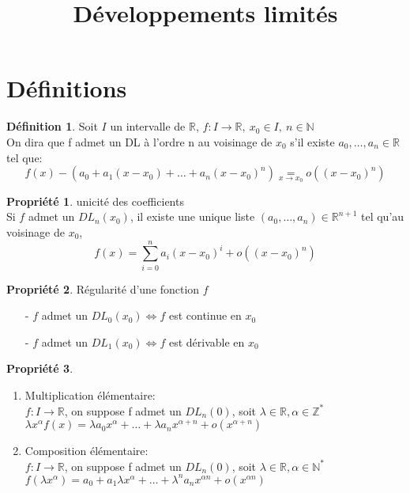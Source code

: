 \documentclass[fleqn]{article}
\title{D\'eveloppements limit\'es}
\date{}
\theoremstyle{definition} \newtheorem*{defi}{D\'efinition}
\theoremstyle{definition} \newtheorem*{theo}{Th\'eor\`eme}
\theoremstyle{definition} \newtheorem*{prop}{Propri\'et\'e}
\theoremstyle{definition} \newtheorem*{coro}{Corollaire}
\theoremstyle{remark} \newtheorem*{rqs}{Remarques}
\begin{document}
\maketitle

\section{D\'efinitions}
\begin{defi}
	Soit $I$ un intervalle de $\mathbb{R}$, $f:I \rightarrow \mathbb{R},\ x_0 \in I,\ n \in \mathbb{N}$ \\
	On dira que f admet un DL \`a l'ordre n au voisinage de $x_0$ s'il existe \mbox{$a_0, \hdots, a_n \in \mathbb{R}$} tel que: \\
	\[f(x) - (a_0 + a_1(x-x_0) + \hdots + a_n(x-x_0)^n) \underset{x \rightarrow x_0}{=} o((x-x_0)^n)\]
\end{defi}

\begin{prop} unicit\'e des coefficients \\
	Si $f$ admet un $DL_n(x_0)$, il existe une unique liste $(a_0, \hdots, a_n) \in \mathbb{R}^{n+1}$ tel qu'au voisinage de $x_0$,
	\[f(x) = \sum_{i=0}^{n} a_i(x-x_0)^i  + o((x-x_0)^n)\]
\end{prop}

\begin{prop} R\'egularit\'e d'une fonction $f$
	\begin{itemize}
		\item [-] $f$ admet un $DL_0(x_0) \Leftrightarrow f$ est continue en $x_0$
		\item [-] $f$ admet un $DL_1(x_0) \Leftrightarrow f$ est d\'erivable en $x_0$
	\end{itemize}
\end{prop}

\begin{prop}
	$\ $
	\begin{enumerate}
		\item Multiplication \'el\'ementaire: \\
		$f: I \rightarrow \mathbb{R}$, on suppose f admet un $DL_n(0)$, soit $\lambda \in \mathbb{R}, \alpha \in \mathbb{Z}^{*}$ \\
		$\lambda x^{\alpha} f(x) = \lambda a_0 x^{\alpha} + \hdots + \lambda a_n x^{\alpha+n} + o(x^{\alpha + n})$
		\item Composition \'el\'ementaire: \\
		$f: I \rightarrow \mathbb{R}$, on suppose f admet un $DL_n(0)$, soit $\lambda \in \mathbb{R}, \alpha \in \mathbb{N}^*$ \\
		$f(\lambda x^{\alpha}) = a_0 + a_1 \lambda x^{\alpha} + \hdots + \lambda ^n a_n x^{\alpha n} + o(x^{\alpha n})$
	\end{enumerate}
\end{prop}
\end{document}
